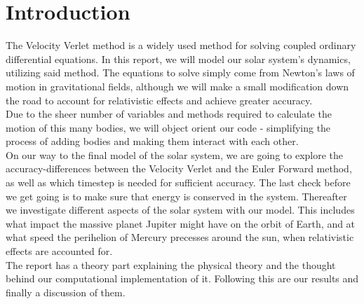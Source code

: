 \documentclass[../main.tex]{subfiles}
\begin{document}
\section{Introduction}\label{introduction}
The Velocity Verlet method is a widely used method for solving coupled ordinary differential equations. In this report, we will model our solar system's dynamics, utilizing said method. The equations to solve simply come from Newton's laws of motion in gravitational fields, although we will make a small modification down the road to account for relativistic effects and achieve greater accuracy.\\
Due to the sheer number of variables and methods required to calculate the motion of this many bodies, we will object orient our code - simplifying the process of adding bodies and making them interact with each other. \\
On our way to the final model of the solar system, we are going to explore the accuracy-differences between the Velocity Verlet and the Euler Forward method, as well as which timestep is needed for sufficient accuracy. The last check before we get going is to make sure that energy is conserved in the system. Thereafter we investigate different aspects of the solar system with our model. This includes what impact the massive planet Jupiter might have on the orbit of Earth, and at what speed the perihelion of Mercury precesses around the sun, when relativistic effects are accounted for. \\
The report has a theory part explaining the physical theory and the thought behind our computational implementation of it. Following this are our results and finally a discussion of them.
\end{document}
